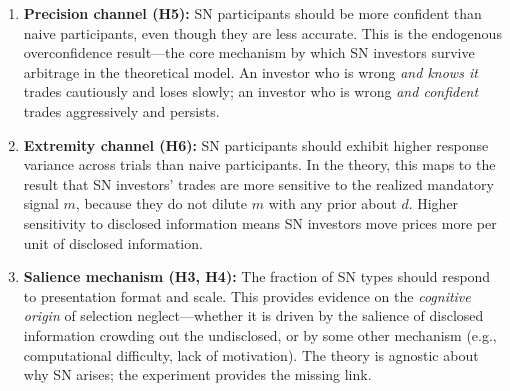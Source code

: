 \documentclass[12pt]{article}
\theoremstyle{definition}
\begin{document}
\begin{enumerate}

\item \textbf{Precision channel (H5):} SN participants should be more confident than naive participants, even though they are less accurate. This is the endogenous overconfidence result---the core mechanism by which SN investors survive arbitrage in the theoretical model. An investor who is wrong \emph{and knows it} trades cautiously and loses slowly; an investor who is wrong \emph{and confident} trades aggressively and persists.

\item \textbf{Extremity channel (H6):} SN participants should exhibit higher response variance across trials than naive participants. In the theory, this maps to the result that SN investors' trades are more sensitive to the realized mandatory signal $m$, because they do not dilute $m$ with any prior about $d$. Higher sensitivity to disclosed information means SN investors move prices more per unit of disclosed information.

\item \textbf{Salience mechanism (H3, H4):} The fraction of SN types should respond to presentation format and scale. This provides evidence on the \emph{cognitive origin} of selection neglect---whether it is driven by the salience of disclosed information crowding out the undisclosed, or by some other mechanism (e.g., computational difficulty, lack of motivation). The theory is agnostic about why SN arises; the experiment provides the missing link.

\end{enumerate}
\end{document}
